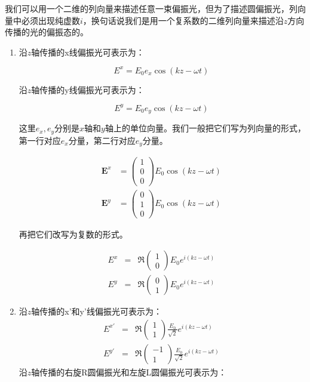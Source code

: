 我们可以用一个二维的列向量来描述任意一束偏振光，但为了描述圆偏振光，列向量中必须出现纯虚数$i$，换句话说我们是用一个复系数的二维列向量来描述沿$z$方向传播的光的偏振态的。


\begin{enumerate}
\item 

沿$z$轴传播的x线偏振光可表示为：

\begin{equation}
E^{x} = E_0 e_x \cos (k z - \omega t)~ 
\end{equation}

沿$z$轴传播的y线偏振光可表示为：

\begin{equation}
E^{y} = E_0 e_y \cos (k z - \omega t)~
\end{equation}

这里$e_x, e_y$分别是$x$轴和$y$轴上的单位向量。我们一般把它们写为列向量的形式，第一行对应$e_x$分量，第二行对应$e_y$分量。

\begin{align}
\mathbf{E}^{x} &= \begin{pmatrix} 
1 \\ 
0 \\
0 
\end{pmatrix} E_0 \cos(kz - \omega t) \\
\mathbf{E}^{y} &= \begin{pmatrix} 
0 \\
1 \\
0 
\end{pmatrix} E_0 \cos(kz - \omega t)~
\end{align}

再把它们改写为复数的形式。

\begin{align}
E^{x} & = & \Re \left( \begin{array}{ccc} 1 \\ 0  \end{array} \right)  E_0 e^{i ( kz - \omega t  )}~  \\
E^{y} & = & \Re \left( \begin{array}{ccc} 0 \\ 1  \end{array} \right)  E_0 e^{i ( kz - \omega t  ) }~  
\end{align}

\item

沿$z$轴传播的x'和y'线偏振光可表示为：
\begin{align}
E^{x'} & = & \Re \left( \begin{array}{ccc} 1 \\ 1  \end{array} \right)  \frac{ E_0 }{ \sqrt{2} }   e^{i ( kz - \omega t  )}~  \\
E^{y'} & = & \Re \left( \begin{array}{ccc} -1 \\ 1  \end{array} \right)  \frac{E_0}{ \sqrt{2} }  e^{i ( kz - \omega t  ) }~
\end{align}
沿$z$轴传播的右旋R圆偏振光和左旋L圆偏振光可表示为：


\end{enumerate}
